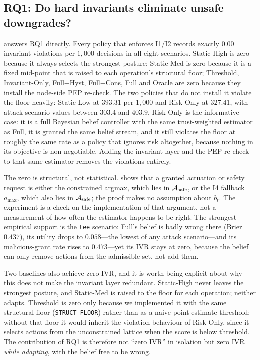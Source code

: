 

\subsection{RQ1: Do hard invariants eliminate unsafe downgrades?}
\label{sec:rq1}

 answers RQ1 directly. Every policy that enforces I1/I2 records
exactly $0.00$ invariant violations per $1{,}000$ decisions in all eight
scenarios. Static-High is zero because it always selects the strongest posture;
Static-Med is zero because it is a fixed mid-point that is raised to each
operation's structural floor; Threshold, Invariant-Only, Full$-$Hyst, Full$-$Cons,
Full and Oracle are zero because they install the node-side PEP re-check. The two policies that do not install
it violate the floor heavily: Static-Low at $393.31$ per $1{,}000$ and Risk-Only
at $327.41$, with attack-scenario values between $303.4$ and $403.9$. Risk-Only is
the informative case: it is a full Bayesian belief controller with the same
trust-weighted estimator as Full, it is granted the same belief stream, and it
still violates the floor at roughly the same rate as a policy that ignores risk
altogether, because nothing in its objective is non-negotiable. Adding the
invariant layer and the PEP re-check to that same estimator removes the
violations entirely.

The zero is structural, not statistical.  shows that a
granted actuation or safety request is either the constrained argmax, which lies
in $\mathcal{A}_{\mathrm{safe}}$, or the I4 fallback $a_{\max}$, which also lies in $\mathcal{A}_{\mathrm{safe}}$; the proof
makes no assumption about $b_t$. The experiment is a check on the implementation
of that argument, not a measurement of how often the estimator happens to be
right. The strongest empirical support is the \texttt{tee} scenario: Full's
belief is badly wrong there (Brier $0.437$), its utility drops to $0.058$---the
lowest of any attack scenario---and its malicious-grant rate rises to $0.473$---yet
its IVR stays at zero, because the belief can only remove actions from the
admissible set, not add them.

Two baselines also achieve zero IVR, and it is worth being explicit about why
this does not make the invariant layer redundant. Static-High never leaves the
strongest posture, and Static-Med is raised to the floor for each operation;
neither adapts. Threshold is zero only
because we implemented it with the same structural floor
(\texttt{STRUCT\_FLOOR}) rather than as a naive point-estimate threshold; without
that floor it would inherit the violation behaviour of Risk-Only, since it selects
actions from the unconstrained lattice when the score is below threshold. The
contribution of RQ1 is therefore not ``zero IVR'' in isolation but zero IVR
\emph{while adapting}, with the belief free to be wrong.

